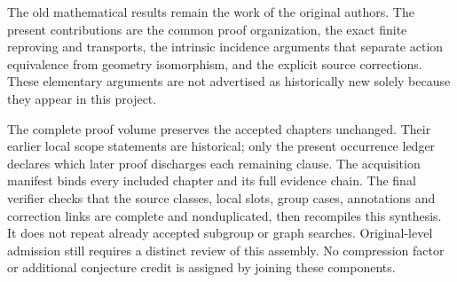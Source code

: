 The old mathematical results remain the work of the original authors.
The present contributions are the common proof organization, the exact
finite reproving and transports, the intrinsic incidence arguments that
separate action equivalence from geometry isomorphism, and the explicit
source corrections. These elementary arguments are not advertised as
historically new solely because they appear in this project.

The complete proof volume preserves the accepted chapters unchanged.
Their earlier local scope statements are historical;
only the present occurrence ledger declares which later proof discharges
each remaining clause. The acquisition manifest binds every included
chapter and its full evidence chain. The final verifier checks that the
source classes, local slots, group cases, annotations and correction
links are complete and nonduplicated, then recompiles this synthesis.
It does not repeat already accepted subgroup or graph searches.
Original-level admission still requires a distinct review of this
assembly. No compression factor or additional conjecture credit is
assigned by joining these components.



